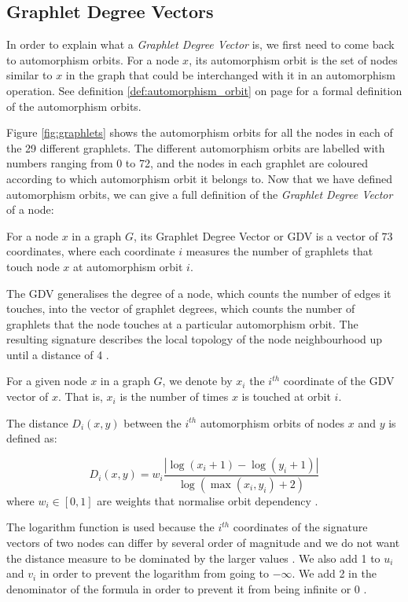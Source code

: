 \subsection{Graphlet Degree Vectors}
\label{sec:gdv}

In order to explain what a \emph{Graphlet Degree Vector} is, we first need to come back to automorphism orbits. For a node $x$, its automorphism orbit is the set of nodes similar to $x$ in the graph that could be interchanged with it in an automorphism operation. See definition \ref{def:automorphism_orbit} on page \pageref{def:automorphism_orbit} for a formal definition of the automorphism orbits. 


Figure \ref{fig:graphlets} shows the automorphism orbits for all the nodes in each of the 29 different graphlets. The different automorphism orbits are labelled with numbers ranging from 0 to 72, and the nodes in each graphlet are coloured according to which automorphism orbit it belongs to. Now that we have defined automorphism orbits, we can give a full definition of the \emph{Graphlet Degree Vector} of a node:

\begin{mydef}
For a node $x$ in a graph $G$, its Graphlet Degree Vector or GDV is a vector of $73$ coordinates, where each coordinate $i$ measures the number of graphlets that touch node $x$ at automorphism orbit $i$.
\end{mydef}

The GDV generalises the degree of a node, which counts the number of edges it touches, into the vector of graphlet degrees, which counts the number of graphlets that the node touches at a particular automorphism orbit. The resulting signature describes the local topology of the node neighbourhood up until a distance of 4 \cite{milenkoviae2008uncovering}.

For a given node $x$ in a graph $G$, we denote by $x_i$ the $i^{th}$ coordinate of the GDV vector of $x$. That is, $x_i$ is the number of times $x$ is touched at orbit $i$. 

\begin{mydef}
The distance $D_i(x,y)$ between the $i^{th}$ automorphism orbits of nodes $x$ and $y$ is defined as: 

\[D_i(x,y)=w_i \frac{|\log(x_i+1)-\log(y_i+1)|}{\log(\max(x_i,y_i)+2)}\]
where $w_i \in [0,1]$ are weights that normalise orbit dependency \emph{\cite{milenkoviae2008uncovering}}.
\end{mydef}

The logarithm function is used because the $i^{th}$ coordinates of the signature vectors of two nodes can differ by several order of magnitude and we do not want the distance measure to be dominated by the larger values \cite{milenkoviae2008uncovering}. We also add 1 to $u_i$ and $v_i$ in order to prevent the logarithm from going to $-\infty$. We add 2 in the denominator of the formula in order to prevent it from being infinite or 0 \cite{milenkoviae2008uncovering}.


